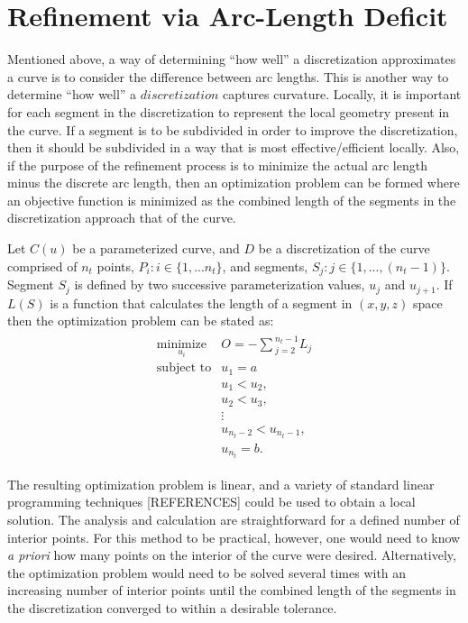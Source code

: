 \section{Refinement via Arc-Length Deficit}
Mentioned above, a way of determining ``how well'' a discretization 
approximates a curve is to consider the difference between arc lengths. 
This is another way to determine ``how well'' a $discretization$ captures curvature. Locally, it is important for each segment in the discretization to represent the local geometry present in the curve. If a segment is to be subdivided in order to improve the discretization, then it should be subdivided in a way that is most effective/efficient locally. Also, if the purpose of the refinement process is to minimize the actual arc length minus the discrete arc length, then an optimization problem can be formed where an objective function is minimized as the combined length of the segments in the discretization approach that of the curve.

Let $C(u)$ be a parameterized curve, and $D$ be a discretization of the 
curve comprised of $n_t$ points, $P_i : i \in \{1,...n_t\}$, and segments, $S_j : j \in \{1,...,(n_t-1)\}$. Segment $S_j$ is defined by two successive parameterization values, $u_j$ and $u_{j+1}$. If $L(S)$ is a function that calculates the length of a segment in $(x,y,z)$ space then the optimization problem can be stated as:
\begin{eqnarray*}
\begin{array}{cl}
\underset{u_i}{\text{minimize}} & O=-\sum{_{j=2}^{n_t-1}L_j} \\
\text{subject to} & u_1 = a \\
& u_1 < u_2, \\ 
& u_2 < u_3, \\
& \vdots \\
& u_{n_t-2} < u_{n_t-1},\\ 
& u_{n_t} = b.
\end{array}
\end{eqnarray*}

\noindent The resulting optimization problem is linear, and a 
variety of standard linear programming techniques [REFERENCES] could be 
used to obtain a local solution. The analysis 
and calculation are straightforward for a defined number of interior 
points. For this method to be practical, however, one would need to know 
{\it{a priori}} how many points on the interior of the curve were desired. 
Alternatively, the optimization problem would need to be solved 
several times with an increasing number of interior points until the 
combined length of the segments in the discretization converged to within 
a desirable tolerance.

